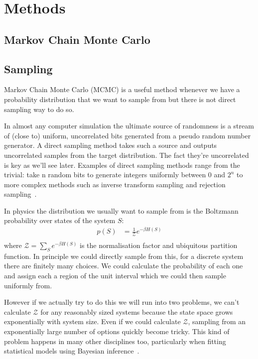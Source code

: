 \hypertarget{fk-methods}{%
\section{Methods}\label{fk-methods}}

\hypertarget{markov-chain-monte-carlo}{%
\subsection{Markov Chain Monte Carlo}\label{markov-chain-monte-carlo}}

\hypertarget{sampling}{%
\subsection{Sampling}\label{sampling}}

Markov Chain Monte Carlo (MCMC) is a useful method whenever we have a probability distribution that we want to sample from but there is not direct sampling way to do so.

In almost any computer simulation the ultimate source of randomness is a stream of (close to) uniform, uncorrelated bits generated from a pseudo random number generator. A direct sampling method takes such a source and outputs uncorrelated samples from the target distribution. The fact they're uncorrelated is key as we'll see later. Examples of direct sampling methods range from the trivial: take n random bits to generate integers uniformly between 0 and \(2^n\) to more complex methods such as inverse transform sampling and rejection sampling~\autocite{devroyeRandomSampling1986}.

In physics the distribution we usually want to sample from is the Boltzmann probability over states of the system \(S\): \[
\begin{aligned}
p(S)  &= \frac{1}{\mathcal{Z}} e^{-\beta H(S)} \\
\end{aligned}
\] where \(\mathcal{Z} = \sum_S e^{-\beta H(S)}\) is the normalisation factor and ubiquitous partition function. In principle we could directly sample from this, for a discrete system there are finitely many choices. We could calculate the probability of each one and assign each a region of the unit interval which we could then sample uniformly from.

However if we actually try to do this we will run into two problems, we can't calculate \(\mathcal{Z}\) for any reasonably sized systems because the state space grows exponentially with system size. Even if we could calculate \(\mathcal{Z}\), sampling from an exponentially large number of options quickly become tricky. This kind of problem happens in many other disciplines too, particularly when fitting statistical models using Bayesian inference~\autocite{BMCP2021}.

